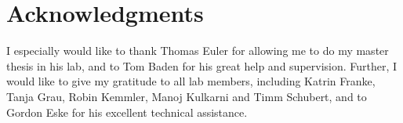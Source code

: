 \chapter{Acknowledgments}

I especially would like to thank Thomas Euler for allowing me to do my master thesis in his lab, and to Tom Baden for his great help and supervision. Further, I would like to give my gratitude to all lab members, including Katrin Franke, Tanja Grau, Robin Kemmler, Manoj Kulkarni and Timm Schubert, and to Gordon Eske for his excellent technical assistance.